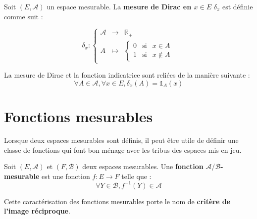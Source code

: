 \documentclass[../integ-proba.tex]{subfiles}
\begin{document}
  \begin{defi}
    Soit $\left(E,\mathcal{A}\right)$ un espace mesurable.
    La \textbf{mesure de Dirac en $x \in E$} $\delta_x$ est définie comme suit :

    \begin{displaymath}
      \delta_x :
    \left\{
    \begin{array}{ccc}
      \mathcal{A} & \longrightarrow & \mathbb{R}_+\\
      A &                                   \longmapsto    &
        \left\{
        \begin{array}{rcl}
          0 & \text{si} & x \in A\\
          1 & \text{si} & x \notin A
        \end{array}
        \right.
    \end{array}
    \right.
    \end{displaymath}
  \end{defi}

  \begin{rem}
    La mesure de Dirac et la fonction indicatrice sont reliées de la manière suivante :
    \begin{displaymath}
      \forall A \in \mathcal{A}, \forall x \in E, \delta_x(A)=\mathds{1}_A(x)
    \end{displaymath}
  \end{rem}

  \section{Fonctions mesurables}

  Lorsque deux espaces mesurables sont définis, il peut être utile de définir une classe de fonctions qui font bon ménage avec les tribus des espaces mis en jeu.

  \begin{defi}
    Soit $\left(E, \mathcal{A}\right)$ et $\left(F, \mathcal{B}\right)$ deux espaces mesurables.
    Une \textbf{fonction } $\mathcal{A}$/$\mathcal{B}$\textbf{-mesurable} est une fonction $f : E \longrightarrow F$ telle que :
    \begin{displaymath}
      \forall Y \in \mathcal{B}, f^{-1}(Y) \in \mathcal{A}
    \end{displaymath}
  \end{defi}

  \begin{rem}
    Cette caractérisation des fonctions mesurables porte le nom de \textbf{critère de l'image réciproque}.
  \end{rem}
\end{document}
